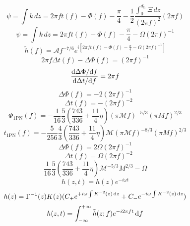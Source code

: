 \begin{equation}
    \psi=\int k\,d z=2\pi ft(f)-\Phi(f)-\frac{\pi}{4}-\frac{1}{2}\frac{\int_0^{d_\text{L}}\Xi\,d z}{(2\pi f)^2}(2\pi f)
\end{equation}
\begin{equation}
    \psi=\int k\,d z=2\pi ft(f)-\Phi(f)-\frac{\pi}{4}-\Omega(2\pi f)^{-1}
\end{equation}
\begin{equation}
    \tilde{h}(f)=\mathcal{A} f^{-7/6}e^{i[2\pi ft(f)-\Phi(f)-\frac{\pi}{4}-\Omega(2\pi f)^{-1}]}
\end{equation}
\begin{equation}
    2\pi f\Delta t(f)-\Delta \Phi(f)=(2\pi f)^{-1}
\end{equation}
\begin{equation}
    \frac{\mathrm{d} \Delta \Phi/\mathrm{d} f}{\mathrm{d} \Delta t/\mathrm{d} f}=2\pi f
\end{equation}
\begin{equation}
    \Delta \Phi(f)=-2(2\pi f)^{-1}
\end{equation}
\begin{equation}
    \quad\Delta t(f)=-(2\pi f)^{-2}
\end{equation}
\begin{equation}
    \Phi_{\text{1PN}}(f)=-\frac{1}{16}\frac{5}{3}(\frac{743}{336}+\frac{11}{4}\eta)(\pi\mathcal{M}f)^{-5/3}(\pi Mf)^{2/3}
\end{equation}
\begin{equation}
    t_{\text{1PN}}(f)=-\frac{5}{256}\frac{4}{3}(\frac{743}{336}+\frac{11}{4}\eta)\mathcal{M}(\pi\mathcal{M}f)^{-8/3}(\pi Mf)^{2/3}
\end{equation}
\begin{equation}
    \Delta \Phi(f)=2\Omega(2\pi f)^{-1}
\end{equation}
\begin{equation}
    \quad\Delta t(f)=\Omega(2\pi f)^{-2}
\end{equation}
\begin{equation}
    \frac{1}{16}\frac{5}{3}(\frac{743}{336}+\frac{11}{4}\eta)\mathcal{M}^{-5/3}M^{2/3}-\Omega
\end{equation}
\begin{equation}
    h(z,t)=h(z)e^{-i\omega t}
\end{equation}
\begin{equation}
    h(z)=\Gamma^{-1}(z)K(z)(C_+e^{+i\omega\int K^{-2}(z)\,\mathrm{d} z}+C_-e^{-i\omega\int K^{-2}(z)\,\mathrm{d} z})
\end{equation}
\begin{equation}
    h(z,t)=\int_{-\infty}^{+\infty}\tilde{h}(z;f)e^{-i2\pi f t}\,\mathrm{d} f
\end{equation}
